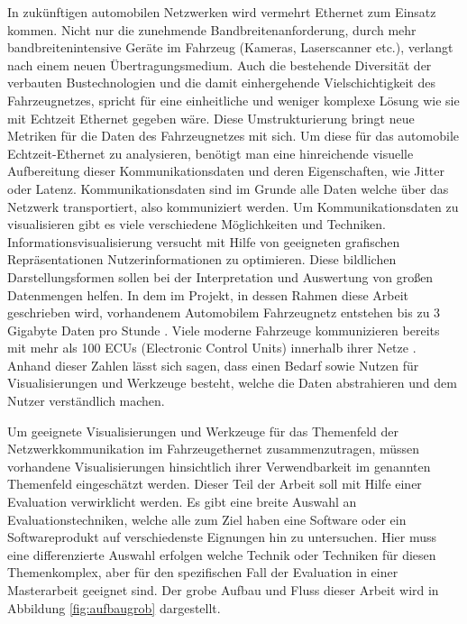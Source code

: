 \documentclass[draft=false
              ,paper=a4
              ,twoside=false
              ,fontsize=11pt
              ,headsepline
              ,BCOR10mm
              ,DIV11
              ]{scrbook}
\begin{document}
In zukünftigen automobilen Netzwerken wird vermehrt Ethernet zum Einsatz kommen. Nicht nur die zunehmende Bandbreitenanforderung, durch mehr bandbreitenintensive Geräte im Fahrzeug (Kameras, Laserscanner etc.), verlangt nach einem neuen Übertragungsmedium. Auch die bestehende Diversität der verbauten Bustechnologien und die damit einhergehende Vielschichtigkeit des Fahrzeugnetzes, spricht für eine einheitliche und weniger komplexe Lösung wie sie mit Echtzeit Ethernet gegeben wäre. Diese Umstrukturierung bringt neue Metriken für die Daten des Fahrzeugnetzes mit sich. Um diese für das automobile Echtzeit-Ethernet zu analysieren, benötigt man eine hinreichende visuelle Aufbereitung dieser Kommunikationsdaten und deren Eigenschaften, wie Jitter oder Latenz. Kommunikationsdaten sind im Grunde alle Daten welche über das Netzwerk transportiert, also kommuniziert werden. Um Kommunikationsdaten zu visualisieren gibt es viele verschiedene Möglichkeiten und Techniken. Informationsvisualisierung versucht mit Hilfe von geeigneten grafischen Repräsentationen Nutzerinformationen zu optimieren. Diese bildlichen Darstellungsformen sollen bei der Interpretation und Auswertung von großen Datenmengen helfen. In dem im Projekt, in dessen Rahmen diese Arbeit geschrieben wird, vorhandenem Automobilem Fahrzeugnetz entstehen bis zu 3 Gigabyte Daten pro Stunde \cite{core_2017}. Viele moderne Fahrzeuge kommunizieren bereits mit mehr als 100 ECUs (Electronic Control Units) innerhalb ihrer Netze \cite{broy_cross-layer_2011}. Anhand dieser Zahlen lässt sich sagen, dass einen Bedarf sowie Nutzen für Visualisierungen und Werkzeuge besteht, welche die Daten abstrahieren und dem Nutzer verständlich machen.

Um geeignete Visualisierungen und Werkzeuge für das Themenfeld der Netzwerkkommunikation im Fahrzeugethernet zusammenzutragen, müssen vorhandene Visualisierungen hinsichtlich ihrer Verwendbarkeit im genannten Themenfeld eingeschätzt werden. Dieser Teil der Arbeit soll mit Hilfe einer Evaluation verwirklicht werden. Es gibt eine breite Auswahl an Evaluationstechniken, welche alle zum Ziel haben eine Software oder ein Softwareprodukt auf verschiedenste Eignungen hin zu untersuchen. Hier muss eine differenzierte Auswahl erfolgen welche Technik oder Techniken für diesen Themenkomplex, aber für den spezifischen Fall der Evaluation in einer Masterarbeit geeignet sind. Der grobe Aufbau und Fluss dieser Arbeit wird in Abbildung \ref{fig:aufbaugrob} dargestellt. 
\end{document}
